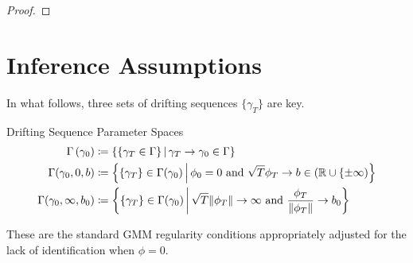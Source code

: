 \documentclass[11pt, letterpaper, twoside, final]{article}
\begin{document}
\begin{appendices}
\begin{proof}
\end{proof}

\section{Inference Assumptions}

    In what follows, three sets of drifting sequences $\lbrace \gamma_T \rbrace$ are key. 
    
    \begin{defn}{Drifting Sequence Parameter Spaces}
        \begin{align}
            \Gamma\left(\gamma_0\right) &\coloneqq \left\lbrace \left\lbrace \gamma_T \in \Gamma \right\rbrace
            \mvert \gamma_T \to \gamma_0 \in \Gamma \right\rbrace\\ 
            \Gamma(\gamma_0, 0, b) &\coloneqq \left\lbrace \lbrace \gamma_T \rbrace \in \Gamma(\gamma_0) \mvert
            \phi_0 = 0\ \text{and}\ \sqrt{T} \phi_T \to b \in (\R \cup \lbrace \pm \infty) \right\rbrace \\
            \Gamma(\gamma_0, \infty, b_0) &\coloneqq \left\lbrace \lbrace \gamma_T \rbrace \in \Gamma (\gamma_0)
            \mvert \sqrt{T} \norm{\phi_T} \to \infty\ \text{and}\ \frac{\phi_T}{\norm{\phi_T}} \to b_0
            \right\rbrace 
        \end{align}
    \end{defn}
    
    These are the standard GMM regularity conditions appropriately adjusted for the lack of identification when
    $\phi =0$.
    

\end{appendices}
\end{document}
